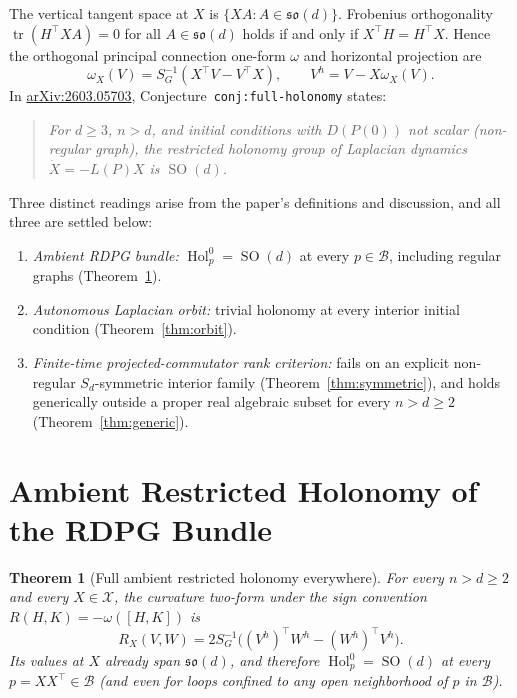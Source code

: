 \documentclass[11pt]{article}
\theoremstyle{plain}
\newtheorem{theorem}{Theorem}
\theoremstyle{definition}
\theoremstyle{remark}
\DeclareMathOperator{\tr}{tr}
\DeclareMathOperator{\Hol}{Hol}
\DeclareMathOperator{\SO}{SO}
\begin{document}
The vertical tangent space at $X$ is $\{XA : A \in \mathfrak{so}(d)\}$.
Frobenius orthogonality $\tr(H^\top XA) = 0$ for all $A \in \mathfrak{so}(d)$ holds if and only if $X^\top H = H^\top X$.
Hence the orthogonal principal connection one-form $\omega$ and horizontal projection are
\[
\omega_X(V) = S_G^{-1}(X^\top V - V^\top X),
\qquad
V^h = V - X\omega_X(V).
\]
In \href{https://arxiv.org/abs/2603.05703}{arXiv:2603.05703}, Conjecture~\texttt{conj:full-holonomy} states:
\begin{quote}
\emph{For $d \ge 3$, $n > d$, and initial conditions with $D(P(0))$ not scalar (non-regular graph), the restricted holonomy group of Laplacian dynamics $\dot{X} = -L(P)X$ is $\SO(d)$.}
\end{quote}
Three distinct readings arise from the paper's definitions and discussion, and all three are settled below:
\begin{enumerate}[label=\textup{(\arabic*)},leftmargin=2em,itemsep=2pt]
\item \emph{Ambient RDPG bundle:} $\Hol_p^0 = \SO(d)$ at every $p \in \mathcal{B}$, including regular graphs (Theorem~\ref{thm:ambient}).
\item \emph{Autonomous Laplacian orbit:} trivial holonomy at every interior initial condition (Theorem~\ref{thm:orbit}).
\item \emph{Finite-time projected-commutator rank criterion:} fails on an explicit non-regular $S_d$-symmetric interior family (Theorem~\ref{thm:symmetric}), and holds generically outside a proper real algebraic subset for every $n > d \ge 2$ (Theorem~\ref{thm:generic}).
\end{enumerate}

\section{Ambient Restricted Holonomy of the RDPG Bundle}

\begin{theorem}[Full ambient restricted holonomy everywhere]\label{thm:ambient}
For every $n > d \ge 2$ and every $X \in \mathcal{X}$, the curvature two-form under the sign convention $R(H, K) = -\omega([H, K])$ is
\begin{equation}\label{eq:curv}
R_X(V, W) = 2 S_G^{-1}\bigl((V^h)^\top W^h - (W^h)^\top V^h\bigr).
\end{equation}
Its values at $X$ already span $\mathfrak{so}(d)$, and therefore $\Hol_p^0 = \SO(d)$ at every $p = XX^\top \in \mathcal{B}$ (and even for loops confined to any open neighborhood of $p$ in $\mathcal{B}$).
\end{theorem}
\end{document}

